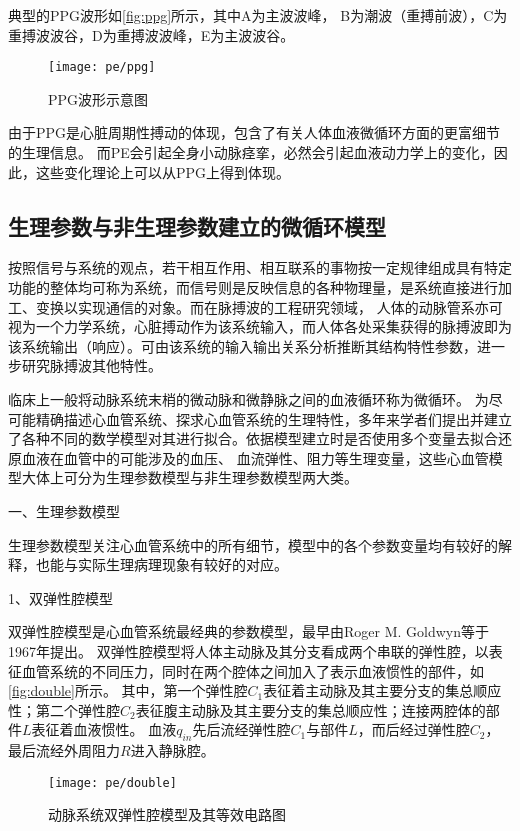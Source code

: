 典型的PPG波形如\autoref{fig:ppg}所示，其中A为主波波峰，
B为潮波（重搏前波），C为重搏波波谷，D为重搏波波峰，E为主波波谷。
\begin{figure}[htbp]
    \centering
    \texttt{[image: pe/ppg]} 
    \caption{\label{fig:ppg}PPG波形示意图}
\end{figure}

由于PPG是心脏周期性搏动的体现，包含了有关人体血液微循环方面的更富细节的生理信息\cite{PPGYY}。
而PE会引起全身小动脉痉挛，必然会引起血液动力学上的变化，因此，这些变化理论上可以从PPG上得到体现。

\subsection{生理参数与非生理参数建立的微循环模型}
按照信号与系统的观点，若干相互作用、相互联系的事物按一定规律组成具有特定功能的整体均可称为系统，而信号则是反映信息的各种物理量，是系统直接进行加工、变换以实现通信的对象\cite{Alan2019}。而在脉搏波的工程研究领域，
人体的动脉管系亦可视为一个力学系统，心脏搏动作为该系统输入，而人体各处采集获得的脉搏波即为该系统输出（响应）。可由该系统的输入输出关系分析推断其结构特性参数，进一步研究脉搏波其他特性\cite{PPGYY}。

临床上一般将动脉系统末梢的微动脉和微静脉之间的血液循环称为微循环\cite{Abraham2011,John2004}。
为尽可能精确描述心血管系统、探求心血管系统的生理特性，多年来学者们提出并建立了各种不同的数学模型对其进行拟合。依据模型建立时是否使用多个变量去拟合还原血液在血管中的可能涉及的血压、
血流弹性、阻力等生理变量，这些心血管模型大体上可分为生理参数模型与非生理参数模型两大类。

一、生理参数模型

生理参数模型关注心血管系统中的所有细节，模型中的各个参数变量均有较好的解释，也能与实际生理病理现象有较好的对应。

1、双弹性腔模型

双弹性腔模型是心血管系统最经典的参数模型，最早由Roger M. Goldwyn等\cite{Goldwyn1967}于1967年提出。
双弹性腔模型将人体主动脉及其分支看成两个串联的弹性腔，以表征血管系统的不同压力，同时在两个腔体之间加入了表示血液惯性的部件，如\autoref{fig:double}所示。
其中，第一个弹性腔$C_{1}$表征着主动脉及其主要分支的集总顺应性；第二个弹性腔$C_{2}$表征腹主动脉及其主要分支的集总顺应性；连接两腔体的部件$L$表征着血液惯性。
血液$q_{in}$先后流经弹性腔$C_{1}$与部件$L$，而后经过弹性腔$C_{2}$，最后流经外周阻力$R$进入静脉腔。
\begin{figure}[htbp]
    \centering
    \texttt{[image: pe/double]}
    \caption[动脉系统双弹性腔模型及其等效电路图]{\label{fig:double}动脉系统双弹性腔模型及其等效电路图\cite{PPGYY}}
\end{figure}


